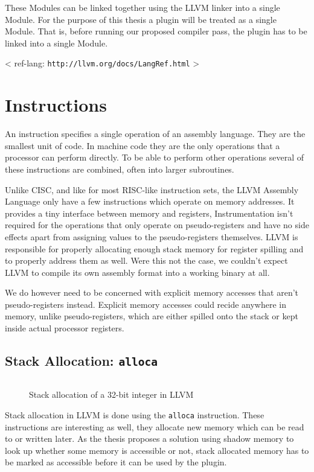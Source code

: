 These Modules can be linked together using the LLVM linker into a single Module.
For the purpose of this thesis a plugin will be treated as a single Module. That
is, before running our proposed compiler pass, the plugin has to be linked into
a single Module.

< ref-lang: \texttt{http://llvm.org/docs/LangRef.html} >


\section {Instructions}

An instruction specifies a single operation of an assembly language. They are
the smallest unit of code. In machine code they are the only operations that a
processor can perform directly. To be able to perform other operations several
of these instructions are combined, often into larger subroutines.

Unlike CISC, and like for most RISC-like instruction sets, the LLVM Assembly
Language only have a few instructions which operate on memory addresses. It
provides a tiny interface between memory and registers, Instrumentation isn't
required for the operations that only operate on pseudo-registers and have no
side effects apart from assigning values to the pseudo-registers themselves.
LLVM is responsible for properly allocating enough stack memory for register
spilling and to properly address them as well. Were this not the case, we
couldn't expect LLVM to compile its own assembly format into a working binary at
all.

We do however need to be concerned with explicit memory accesses that aren't
pseudo-registers instead. Explicit memory accesses could recide anywhere in
memory, unlike pseudo-registers, which are either spilled onto the stack or kept
inside actual processor registers.

\subsection {Stack Allocation: \texttt{alloca}}

\begin{figure}[ht]
\begin{lstlisting}[language=llvm]
%ptr = alloca i32                               ; yields {i32*}:ptr
\end{lstlisting}
\caption{Stack allocation of a 32-bit integer in LLVM}
\end{figure}

\noindent Stack allocation in LLVM is done using the \texttt{alloca}
instruction. These instructions are interesting as well, they allocate new
memory which can be read to or written later. As the thesis proposes a solution
using shadow memory to look up whether some memory is accessible or not, stack
allocated memory has to be marked as accessible before it can be used by the
plugin.

